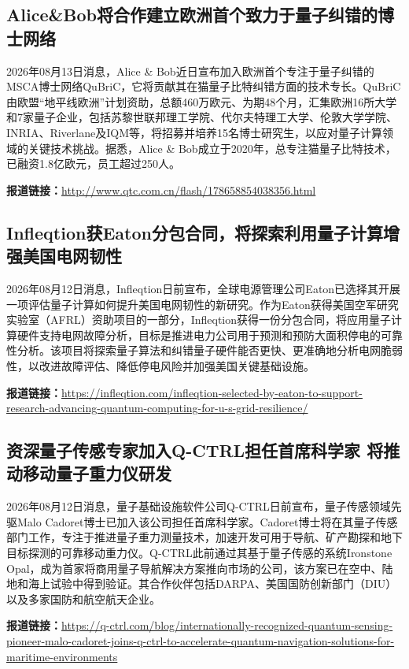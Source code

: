 \documentclass[12pt,a4paper]{ctexart}
\begin{document}
\subsection{ Alice\&Bob将合作建立欧洲首个致力于量子纠错的博士网络 }

2026年08月13日消息，Alice \& Bob近日宣布加入欧洲首个专注于量子纠错的MSCA博士网络QuBriC，它将贡献其在猫量子比特纠错方面的技术专长。QuBriC由欧盟“地平线欧洲”计划资助，总额460万欧元、为期48个月，汇集欧洲16所大学和7家量子企业，包括苏黎世联邦理工学院、代尔夫特理工大学、伦敦大学学院、INRIA、Riverlane及IQM等，将招募并培养15名博士研究生，以应对量子计算领域的关键技术挑战。据悉，Alice \& Bob成立于2020年，总专注猫量子比特技术，已融资1.8亿欧元，员工超过250人。

\noindent\textbf{报道链接：}\url{http://www.qtc.com.cn/flash/178658854038356.html}

\subsection{ Infleqtion获Eaton分包合同，将探索利用量子计算增强美国电网韧性 }

2026年08月12日消息，Infleqtion日前宣布，全球电源管理公司Eaton已选择其开展一项评估量子计算如何提升美国电网韧性的新研究。作为Eaton获得美国空军研究实验室（AFRL）资助项目的一部分，Infleqtion获得一份分包合同，将应用量子计算硬件支持电网故障分析，目标是推进电力公司用于预测和预防大面积停电的可靠性分析。该项目将探索量子算法和纠错量子硬件能否更快、更准确地分析电网脆弱性，以改进故障评估、降低停电风险并加强美国关键基础设施。

\noindent\textbf{报道链接：}\url{https://infleqtion.com/infleqtion-selected-by-eaton-to-support-research-advancing-quantum-computing-for-u-s-grid-resilience/}

\subsection{ 资深量子传感专家加入Q-CTRL担任首席科学家 将推动移动量子重力仪研发 }

2026年08月12日消息，量子基础设施软件公司Q-CTRL日前宣布，量子传感领域先驱Malo Cadoret博士已加入该公司担任首席科学家。Cadoret博士将在其量子传感部门工作，专注于推进量子重力测量技术，加速开发可用于导航、矿产勘探和地下目标探测的可靠移动重力仪。Q-CTRL此前通过其基于量子传感的系统Ironstone Opal，成为首家将商用量子导航解决方案推向市场的公司，该方案已在空中、陆地和海上试验中得到验证。其合作伙伴包括DARPA、美国国防创新部门（DIU）以及多家国防和航空航天企业。

\noindent\textbf{报道链接：}\url{https://q-ctrl.com/blog/internationally-recognized-quantum-sensing-pioneer-malo-cadoret-joins-q-ctrl-to-accelerate-quantum-navigation-solutions-for-maritime-environments}
\end{document}
